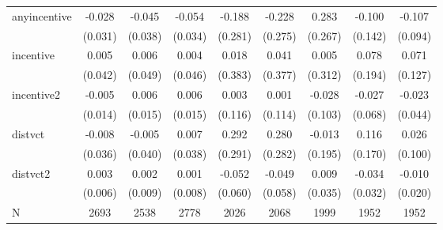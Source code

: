 \begin{tabular}{lcccccccc}
\hline
anyincentive & -0.028 & -0.045 & -0.054 & -0.188 & -0.228 & 0.283 & -0.100 & -0.107 \\
 & (0.031) & (0.038) & (0.034) & (0.281) & (0.275) & (0.267) & (0.142) & (0.094) \\
incentive & 0.005 & 0.006 & 0.004 & 0.018 & 0.041 & 0.005 & 0.078 & 0.071 \\
 & (0.042) & (0.049) & (0.046) & (0.383) & (0.377) & (0.312) & (0.194) & (0.127) \\
incentive2 & -0.005 & 0.006 & 0.006 & 0.003 & 0.001 & -0.028 & -0.027 & -0.023 \\
 & (0.014) & (0.015) & (0.015) & (0.116) & (0.114) & (0.103) & (0.068) & (0.044) \\
distvct & -0.008 & -0.005 & 0.007 & 0.292 & 0.280 & -0.013 & 0.116 & 0.026 \\
 & (0.036) & (0.040) & (0.038) & (0.291) & (0.282) & (0.195) & (0.170) & (0.100) \\
distvct2 & 0.003 & 0.002 & 0.001 & -0.052 & -0.049 & 0.009 & -0.034 & -0.010 \\
 & (0.006) & (0.009) & (0.008) & (0.060) & (0.058) & (0.035) & (0.032) & (0.020) \\
\hline
N & 2693 & 2538 & 2778 & 2026 & 2068 & 1999 & 1952 & 1952 \\
\hline
\end{tabular}
